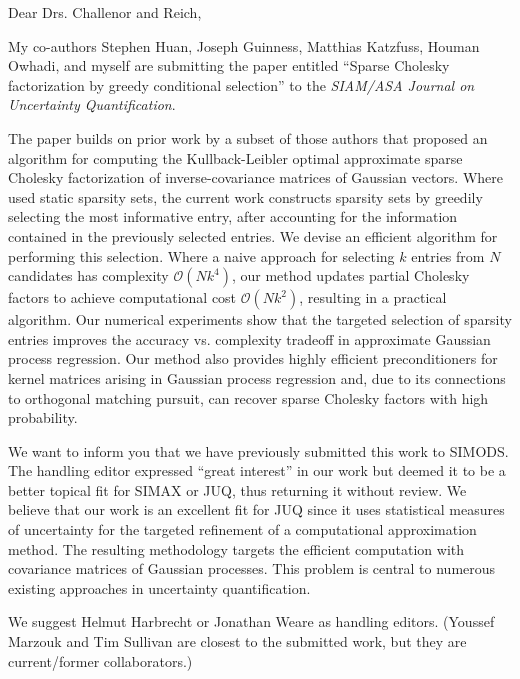\documentclass[10pt]{article}
\begin{document}
Dear Drs. Challenor and Reich,

My co-authors Stephen Huan, Joseph Guinness, Matthias Katzfuss, Houman Owhadi, and myself are submitting the paper entitled ``Sparse Cholesky factorization by greedy conditional selection'' to the \emph{SIAM/ASA Journal on Uncertainty Quantification}. 

The paper builds on prior work \cite{schafer2020sparse} by a subset of those authors that proposed an algorithm for computing the Kullback-Leibler optimal approximate sparse Cholesky factorization of inverse-covariance matrices of Gaussian vectors. 
Where \cite{schafer2020sparse} used static sparsity sets, the current work constructs sparsity sets by greedily selecting the most informative entry, after accounting for the information contained in the previously selected entries.
We devise an efficient algorithm for performing this selection. 
Where a naive approach for selecting $k$ entries from $N$ candidates has complexity $\mathcal{O}(Nk^4)$, our method updates partial Cholesky factors to achieve computational cost $\mathcal{O}(Nk^2)$, resulting in a practical algorithm.
Our numerical experiments show that the targeted selection of sparsity entries improves the accuracy vs. complexity tradeoff in approximate Gaussian process regression. 
Our method also provides highly efficient preconditioners for kernel matrices arising in Gaussian process regression and, due to its connections to orthogonal matching pursuit, can recover sparse Cholesky factors with high probability.

We want to inform you that we have previously submitted this work to SIMODS. The handling editor expressed ``great interest'' in our work but deemed it to be a better topical fit for SIMAX or JUQ, thus returning it without review.  
We believe that our work is an excellent fit for JUQ since it uses statistical measures of uncertainty for the targeted refinement of a computational approximation method. 
The resulting methodology targets the efficient computation with covariance matrices of Gaussian processes. This problem is central to numerous existing approaches in uncertainty quantification.

We suggest Helmut Harbrecht or Jonathan Weare as handling editors. (Youssef Marzouk and Tim Sullivan are closest to the submitted work, but they are current/former collaborators.)
\end{document}
